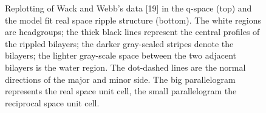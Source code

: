 \begin{figure}
\centerline {}
\caption{Replotting of Wack and Webb's data [19] in the q-space (top) 
and the model fit real space ripple structure (bottom). 
The white regions are headgroups; the thick black lines represent
the central profiles of the rippled bilayers; the darker gray-scaled stripes 
denote the bilayers; the lighter gray-scale space
between the two adjacent bilayers is the water region. 
The dot-dashed lines are the normal directions of the major and
minor side. The big parallelogram represents the real space unit cell,
the small parallelogram the reciprocal space unit cell.
\label{wack_data}}
\end{figure}



